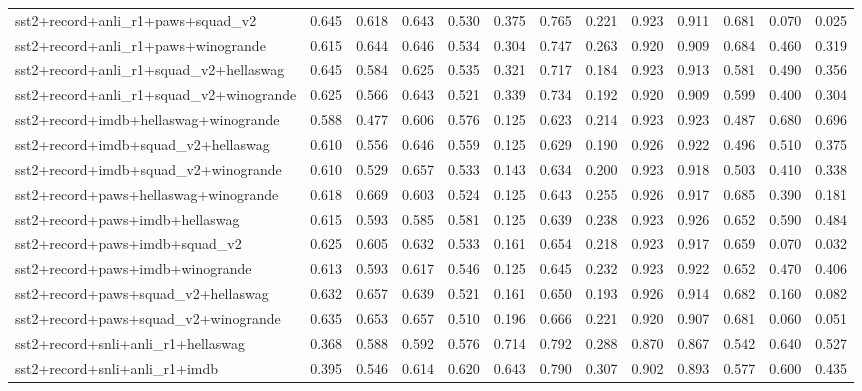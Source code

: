 \begin{table}[t]
\begin{tabular}{lrrrrrrrrrrrr}
    sst2+record+anli\_r1+paws+squad\_v2 & 0.645 & 0.618 & 0.643 & 0.530 & 0.375 & 0.765 & 0.221 & 0.923 & 0.911 & 0.681 & 0.070 & 0.025 \\
    sst2+record+anli\_r1+paws+winogrande & 0.615 & 0.644 & 0.646 & 0.534 & 0.304 & 0.747 & 0.263 & 0.920 & 0.909 & 0.684 & 0.460 & 0.319 \\
    sst2+record+anli\_r1+squad\_v2+hellaswag & 0.645 & 0.584 & 0.625 & 0.535 & 0.321 & 0.717 & 0.184 & 0.923 & 0.913 & 0.581 & 0.490 & 0.356 \\
    sst2+record+anli\_r1+squad\_v2+winogrande & 0.625 & 0.566 & 0.643 & 0.521 & 0.339 & 0.734 & 0.192 & 0.920 & 0.909 & 0.599 & 0.400 & 0.304 \\
    sst2+record+imdb+hellaswag+winogrande & 0.588 & 0.477 & 0.606 & 0.576 & 0.125 & 0.623 & 0.214 & 0.923 & 0.923 & 0.487 & 0.680 & 0.696 \\
    sst2+record+imdb+squad\_v2+hellaswag & 0.610 & 0.556 & 0.646 & 0.559 & 0.125 & 0.629 & 0.190 & 0.926 & 0.922 & 0.496 & 0.510 & 0.375 \\
    sst2+record+imdb+squad\_v2+winogrande & 0.610 & 0.529 & 0.657 & 0.533 & 0.143 & 0.634 & 0.200 & 0.923 & 0.918 & 0.503 & 0.410 & 0.338 \\
    sst2+record+paws+hellaswag+winogrande & 0.618 & 0.669 & 0.603 & 0.524 & 0.125 & 0.643 & 0.255 & 0.926 & 0.917 & 0.685 & 0.390 & 0.181 \\
    sst2+record+paws+imdb+hellaswag & 0.615 & 0.593 & 0.585 & 0.581 & 0.125 & 0.639 & 0.238 & 0.923 & 0.926 & 0.652 & 0.590 & 0.484 \\
    sst2+record+paws+imdb+squad\_v2 & 0.625 & 0.605 & 0.632 & 0.533 & 0.161 & 0.654 & 0.218 & 0.923 & 0.917 & 0.659 & 0.070 & 0.032 \\
    sst2+record+paws+imdb+winogrande & 0.613 & 0.593 & 0.617 & 0.546 & 0.125 & 0.645 & 0.232 & 0.923 & 0.922 & 0.652 & 0.470 & 0.406 \\
    sst2+record+paws+squad\_v2+hellaswag & 0.632 & 0.657 & 0.639 & 0.521 & 0.161 & 0.650 & 0.193 & 0.926 & 0.914 & 0.682 & 0.160 & 0.082 \\
    sst2+record+paws+squad\_v2+winogrande & 0.635 & 0.653 & 0.657 & 0.510 & 0.196 & 0.666 & 0.221 & 0.920 & 0.907 & 0.681 & 0.060 & 0.051 \\
    sst2+record+snli+anli\_r1+hellaswag & 0.368 & 0.588 & 0.592 & 0.576 & 0.714 & 0.792 & 0.288 & 0.870 & 0.867 & 0.542 & 0.640 & 0.527 \\
    sst2+record+snli+anli\_r1+imdb & 0.395 & 0.546 & 0.614 & 0.620 & 0.643 & 0.790 & 0.307 & 0.902 & 0.893 & 0.577 & 0.600 & 0.435 \\

\end{tabular}
\end{table}

